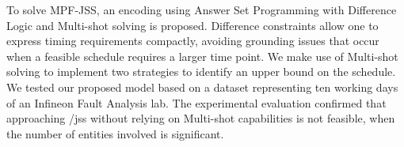 \documentclass[submission,copyright,creativecommons]{eptcs}
\begin{document}
To solve MPF-JSS, an encoding using Answer Set Programming with Difference Logic \cite{gebser2016theory} and Multi-shot solving \cite{gebser2019multi} is proposed. Difference constraints allow one to express timing requirements compactly, avoiding grounding issues that occur when a feasible schedule requires a larger time point. We make use of Multi-shot solving \cite{gebser2019multi} to implement two strategies to identify an upper bound on the schedule.
We tested our proposed model based on a dataset representing ten working days of an Infineon Fault Analysis lab. The experimental evaluation confirmed that approaching /jss without relying on Multi-shot capabilities is not feasible, when the number of entities involved is significant.  %
\end{document}
